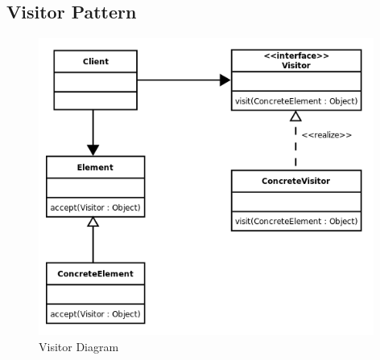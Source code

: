 \subsection{Visitor Pattern}
\begin{figure}[ht!]
	\centering
	\includegraphics[width=110mm]{Figures/visitor_diagram.png}
	\caption{Visitor Diagram\label{overflow}}
\end{figure}
